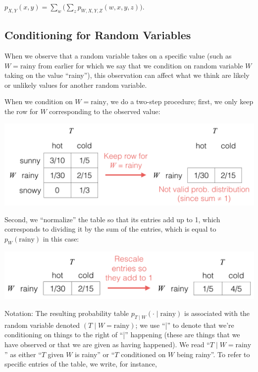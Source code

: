 \documentclass[6008notes.tex]{subfiles}
\begin{document}
{\centering$p_{X,Y}(x, y) = \sum _ w \Big( \sum _ z p_{W,X,Y,Z}(w,x,y,z) \Big).$ \par}
 
\subsection{Conditioning for Random Variables}

When we observe that a random variable takes on a specific value (such as $W=\text {rainy}$ from earlier for which we say that we condition on random variable $W$ taking on the value ``rainy''), this observation can affect what we think are likely or unlikely values for another random variable.

When we condition on $W=\text {rainy}$, we do a two-step procedure; first, we only keep the row for $W$ corresponding to the observed value:

{\centering\includegraphics[scale=0.4]{images_sec-joint-rv-cond-restrict} \par}

Second, we ``normalize'' the table so that its entries add up to 1, which corresponds to dividing it by the sum of the entries, which is equal to $p_{W}(\text {rainy})$ in this case:

{\centering\includegraphics[scale=0.4]{images_sec-joint-rv-cond-renormalize} \par}

Notation: The resulting probability table $p_{T\mid W}(\cdot \mid \text {rainy})$ is associated with the random variable denoted $(T\mid W=\text {rainy})$; we use ``|'' to denote that we're conditioning on things to the right of ``|'' happening (these are things that we have observed or that we are given as having happened). We read ``$T\mid W=\text {rainy}$'' as either ``$T$ given $W$ is rainy'' or ``$T$ conditioned on $W$ being rainy''. To refer to specific entries of the table, we write, for instance,
\end{document}
